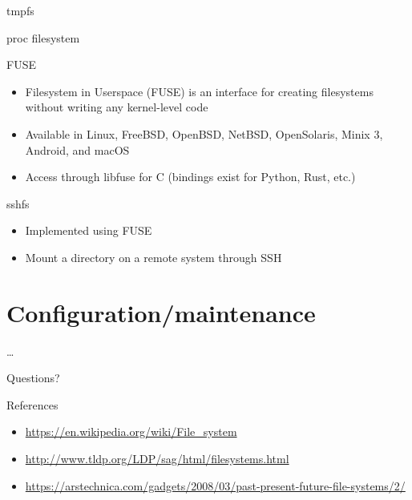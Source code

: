 \documentclass{lug}
\begin{document}
\begin{frame}{tmpfs}
\end{frame}

\begin{frame}{proc filesystem}
\end{frame}

\begin{frame}{FUSE}
\begin{itemize}
    \item Filesystem in Userspace (FUSE) is an interface for creating
    filesystems without writing any kernel-level code
    \item Available in Linux, FreeBSD, OpenBSD, NetBSD, OpenSolaris, Minix 3,
    Android, and macOS
    \item Access through libfuse for C (bindings exist for Python, Rust, etc.)
\end{itemize}
\end{frame}

\begin{frame}{sshfs}
\begin{itemize}
    \item Implemented using FUSE
    \item Mount a directory on a remote system through SSH
\end{itemize}
\end{frame}

\section{Configuration/maintenance}

\begin{frame}{\ldots}
\end{frame}

\begin{frame}[standout]
    \Huge
    Questions?
\end{frame}

\begin{frame}{References}
    \begin{itemize}
        \item \url{https://en.wikipedia.org/wiki/File_system}
        \item \url{http://www.tldp.org/LDP/sag/html/filesystems.html}
        \item \url{https://arstechnica.com/gadgets/2008/03/past-present-future-file-systems/2/}
    \end{itemize}
\end{frame}
\end{document}
